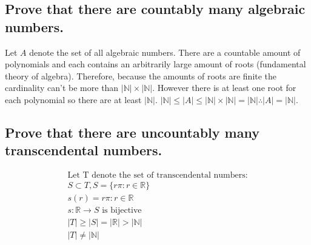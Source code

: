 \documentclass[letterpaper]{article}
\begin{document}
\subsection{Prove that there are countably many algebraic numbers.}
\begin{adjustwidth}{2.35em}{0pt}
Let $A$ denote the set of all algebraic numbers. There are a countable amount of polynomials and each contains an arbitrarily large amount of roots (fundamental theory of algebra). Therefore, because the amounts of roots are finite the cardinality can't be more than $|\mathbb{N}|\times|\mathbb{N}|$. However there is at least one root for each polynomial so there are at least $|\mathbb{N}|$. $|\mathbb{N}|\leq|A|\leq|\mathbb{N}|\times|\mathbb{N}|=|\mathbb{N}|\therefore|A|=|\mathbb{N}|$.
\end{adjustwidth}
\subsection{Prove that there are uncountably many transcendental numbers.}
\begin{gather*}
\text{Let T denote the set of transcendental numbers:} \\
S\subset T, S=\{r\pi:r\in\mathbb{R}\} \\
s(r)=r\pi:r\in\mathbb{R} \\
s:\mathbb{R}\rightarrow S \text{ is bijective} \\
|T|\geq|S|=|\mathbb{R}|>|\mathbb{N}| \\
\boxed{|T|\neq|\mathbb{N}|}
\end{gather*}
\end{document}
